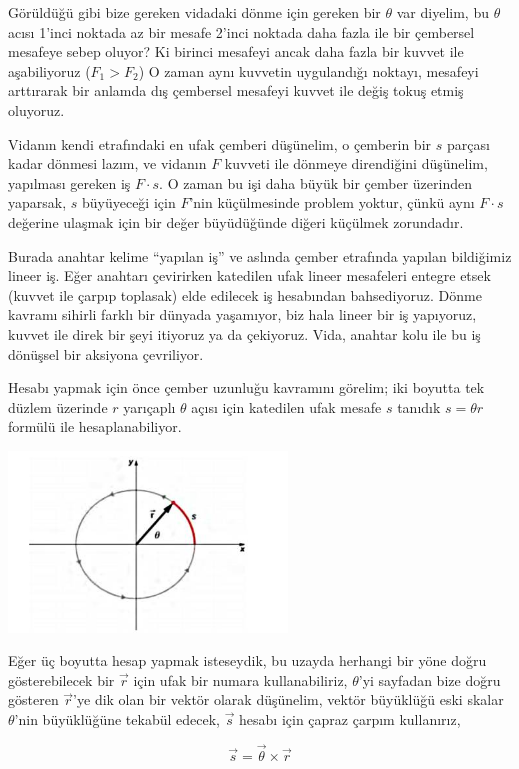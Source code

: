 \documentclass[12pt,fleqn]{article}\usepackage{../../common}
\begin{document}
Görüldüğü gibi bize gereken vidadaki dönme için gereken bir $\theta$ var
diyelim, bu $\theta$ acısı 1'inci noktada az bir mesafe 2'inci noktada daha
fazla ile bir çembersel mesafeye sebep oluyor? Ki birinci mesafeyi ancak daha
fazla bir kuvvet ile aşabiliyoruz ($F_1 > F_2$) O zaman aynı kuvvetin
uygulandığı noktayı, mesafeyi arttırarak bir anlamda dış çembersel mesafeyi
kuvvet ile değiş tokuş etmiş oluyoruz.

Vidanın kendi etrafındaki en ufak çemberi düşünelim, o çemberin bir $s$ parçası
kadar dönmesi lazım, ve vidanın $F$ kuvveti ile dönmeye direndiğini düşünelim,
yapılması gereken iş $F \cdot s$. O zaman bu işi daha büyük bir çember üzerinden
yaparsak, $s$ büyüyeceği için $F$'nin küçülmesinde problem yoktur, çünkü aynı $F
\cdot s$ değerine ulaşmak için bir değer büyüdüğünde diğeri küçülmek zorundadır.

Burada anahtar kelime ``yapılan iş'' ve aslında çember etrafında yapılan
bildiğimiz lineer iş. Eğer anahtarı çevirirken katedilen ufak lineer mesafeleri
entegre etsek (kuvvet ile çarpıp toplasak) elde edilecek iş hesabından
bahsediyoruz. Dönme kavramı sihirli farklı bir dünyada yaşamıyor, biz hala
lineer bir iş yapıyoruz, kuvvet ile direk bir şeyi itiyoruz ya da çekiyoruz.
Vida, anahtar kolu ile bu iş dönüşsel bir aksiyona çevriliyor. 

Hesabı yapmak için önce çember uzunluğu kavramını görelim; iki boyutta tek
düzlem üzerinde $r$ yarıçaplı $\theta$ açısı için katedilen ufak mesafe $s$
tanıdık $s = \theta r$ formülü ile hesaplanabiliyor.

\includegraphics[width=20em]{phy_005_basics_02_06.jpg}

Eğer üç boyutta hesap yapmak isteseydik, bu uzayda herhangi bir yöne doğru
gösterebilecek bir $\vec{r}$ için ufak bir numara kullanabiliriz, $\theta$'yi
sayfadan bize doğru gösteren $\vec{r}$'ye dik olan bir vektör olarak düşünelim,
vektör büyüklüğü eski skalar $\theta$'nin büyüklüğüne tekabül edecek, $\vec{s}$
hesabı için çapraz çarpım kullanırız,

$$
\vec{s} = \vec{\theta} \times \vec{r}
$$
\end{document}

